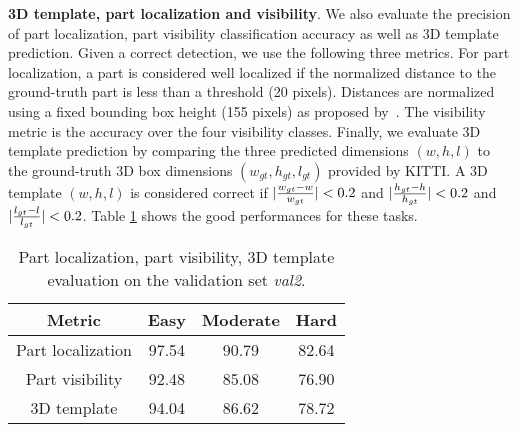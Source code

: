 \documentclass[10pt,twocolumn,letterpaper]{article}
\begin{document}
\textbf{3D template, part localization and visibility}. 
We also evaluate the precision of part localization, part visibility classification accuracy as well as 3D template prediction. Given a correct detection, we use the following three metrics. For part localization, a part is considered well localized if the normalized distance to the ground-truth part is less than a threshold (20 pixels). Distances are normalized using a fixed bounding box height (155 pixels) as proposed by~\cite{Zia3}. The visibility metric is the accuracy over the four visibility classes. Finally, we evaluate 3D template prediction by comparing the three predicted dimensions $(w,h,l)$ to the ground-truth 3D box dimensions $(w_{gt},h_{gt},l_{gt})$ provided by KITTI. A 3D template $(w,h,l)$ is considered correct if $\lvert {{{w_{gt} - w} \over w_{gt}}} \rvert < 0.2$ and $\lvert {{{h_{gt} - h} \over h_{gt}}} \rvert < 0.2$ and $\lvert {{{l_{gt} - l} \over l_{gt}}} \rvert < 0.2$. Table \ref{p_v_t} shows the good performances for these tasks.

\begin{table}[ht]
\centering
\begin{tabular}{|c|c|c|c|}
\hline
Metric & Easy & Moderate & Hard   \\ \hline
Part localization   & 97.54  & 90.79  & 82.64 \\
Part visibility     & 92.48  & 85.08  & 76.90  \\ 
3D template     & 94.04  & 86.62  & 78.72 \\ \hline
\end{tabular}
\vspace*{3mm}
\caption{Part localization, part visibility, 3D template evaluation on the validation set \textit{val2}.}
\label{p_v_t}
\end{table}
\end{document}
